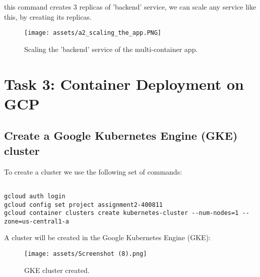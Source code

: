 \documentclass[12pt]{article}
\begin{document}


this command creates 3 replicas of 'backend' service, we can scale any service like this, by creating its replicas.

\begin{figure}[H]
    \centering
    \texttt{[image: assets/a2\_scaling\_the\_app.PNG]}
    \caption{Scaling the 'backend' service of the multi-container app.}
    \label{fig:logo}
\end{figure}

\clearpage

\section{Task 3: Container Deployment on GCP}

\subsection{Create a Google Kubernetes Engine (GKE) cluster}

To create a cluster we use the following set of commands:

\begin{listing}[htbp]
\begin{verbatim}

gcloud auth login
gcloud config set project assignment2-400811
gcloud container clusters create kubernetes-cluster --num-nodes=1 --zone=us-central1-a

\end{verbatim}
\end{listing}

A cluster will be created in the Google Kubernetes Engine (GKE):

\begin{figure}[H]
    \centering
    \texttt{[image: assets/Screenshot (8).png]}
    \caption{GKE cluster created.}
    \label{fig:logo}
\end{figure}


\clearpage
\end{document}
